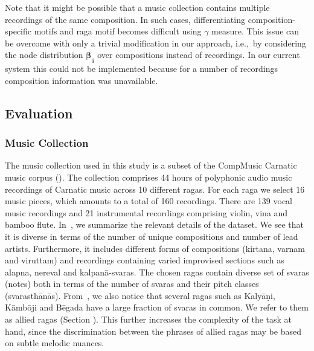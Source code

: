{Note that it might be possible that a music collection contains multiple recordings of the same composition. In such cases, differentiating composition-specific motifs and \gls{raga} motif becomes difficult using $\gamma$ measure. This issue can be overcome with only a trivial modification in our approach, i.e.,~by considering the node distribution ${\boldsymbol{\beta}_q}$ over compositions instead of recordings. In our current system this could not be implemented because for a number of recordings composition information was unavailable.



\subsection{Evaluation}
\label{sec:patterns_characterization_evaluation}

\subsubsection{Music Collection}
\label{sec:patterns_characterization_music_collection}

The music collection used in this study is a subset of the CompMusic Carnatic music corpus (). The collection comprises 44 hours of polyphonic audio music recordings of Carnatic music across 10 different \glspl{raga}. For each \gls{raga} we select 16 music pieces, which amounts to a total of 160 recordings. There are 139 vocal music recordings and 21 instrumental recordings comprising violin, \gls{vina} and bamboo flute. In~, we summarize the relevant details of the dataset. We see that it is diverse in terms of the number of unique compositions and number of lead artists. Furthermore, it includes different forms of compositions (\gls{kirtana}, varnam and viruttam) and recordings containing varied improvised sections such as \gls{alapna}, nereval and kalpan\={a}-\glspl{svara}. %
The chosen \glspl{raga} contain diverse set of \glspl{svara} (notes) both in terms of the number of \glspl{svara} and their pitch classes (svarasth\={a}n\={a}s). From~, 
we also notice that several \glspl{raga} such as Kaly\={a}\d{n}i, K\={a}mb\={o}ji and B\={e}gada have a large fraction of \glspl{svara} in common. We refer to them as allied \glspl{raga} (Section ). This further increases the complexity of the task at hand, since the discrimination between the phrases of allied \glspl{raga} may be based on subtle melodic nuances.

}
